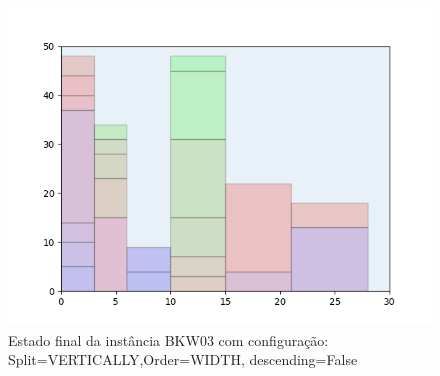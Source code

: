 \begin{figure}[H]
    \centering
    \caption[]{Estado final da instância BKW03 com configuração: Split=VERTICALLY,Order=WIDTH, descending=False}
    \label{fig:bkw03-vertically-width-false}
    \includegraphics[scale=0.5]{output/figures/bkw/bkw03/vertically/width/false/00}
\end{figure}